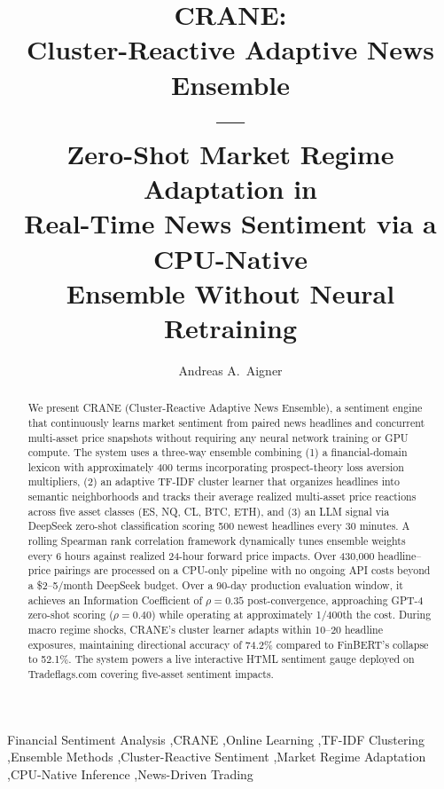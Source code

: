 \documentclass[3p,times]{elsarticle}
\begin{document}
\title{CRANE:\\Cluster-Reactive Adaptive News Ensemble\\---\\Zero-Shot Market Regime Adaptation in\\Real-Time News Sentiment via a CPU-Native\\Ensemble Without Neural Retraining}

\author{Andreas A.~Aigner}
\address{Tradeflags.com\\%
         \texttt{Andreas@tradeflags.com}}

\begin{abstract}
We present CRANE (Cluster-Reactive Adaptive News Ensemble), a sentiment engine that continuously learns market sentiment from paired news headlines and concurrent multi-asset price snapshots without requiring any neural network training or GPU compute. The system uses a three-way ensemble combining (1) a financial-domain lexicon with approximately 400 terms incorporating prospect-theory loss aversion multipliers, (2) an adaptive TF-IDF cluster learner that organizes headlines into semantic neighborhoods and tracks their average realized multi-asset price reactions across five asset classes (ES, NQ, CL, BTC, ETH), and (3) an LLM signal via DeepSeek zero-shot classification scoring 500 newest headlines every 30 minutes. A rolling Spearman rank correlation framework dynamically tunes ensemble weights every 6 hours against realized 24-hour forward price impacts. Over 430,000 headline--price pairings are processed on a CPU-only pipeline with no ongoing API costs beyond a \$2--5/month DeepSeek budget. Over a 90-day production evaluation window, it achieves an Information Coefficient of $\rho = 0.35$ post-convergence, approaching GPT-4 zero-shot scoring ($\rho = 0.40$) while operating at approximately 1/400th the cost. During macro regime shocks, CRANE's cluster learner adapts within 10--20 headline exposures, maintaining directional accuracy of 74.2\% compared to FinBERT's collapse to 52.1\%. The system powers a live interactive HTML sentiment gauge deployed on Tradeflags.com covering five-asset sentiment impacts.
\end{abstract}

\begin{keyword}
Financial Sentiment Analysis \sep CRANE \sep Online Learning \sep TF-IDF Clustering \sep Ensemble Methods \sep Cluster-Reactive Sentiment \sep Market Regime Adaptation \sep CPU-Native Inference \sep News-Driven Trading
\end{keyword}

\maketitle











\end{document}
